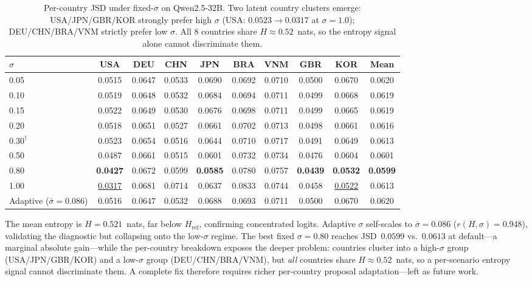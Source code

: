 \documentclass{article}
\begin{document}
\begin{table}[h]\centering\scriptsize
\caption{Per-country JSD under fixed-$\sigma$ on Qwen2.5-32B. Two latent country
clusters emerge: USA/JPN/GBR/KOR strongly prefer high $\sigma$ (USA: $0.0523\to0.0317$
at $\sigma{=}1.0$); DEU/CHN/BRA/VNM strictly prefer low $\sigma$. All 8 countries
share $H\approx0.52$~nats, so the entropy signal alone cannot discriminate them.}
\label{tab:sigma_percountry}
\begin{tabular}{lcccccccc|c}\toprule
$\sigma$ & USA & DEU & CHN & JPN & BRA & VNM & GBR & KOR & Mean \\\midrule
0.05 & 0.0515 & 0.0647 & 0.0533 & 0.0690 & 0.0692 & 0.0710 & 0.0500 & 0.0670 & 0.0620 \\
0.10 & 0.0519 & 0.0648 & 0.0532 & 0.0684 & 0.0694 & 0.0711 & 0.0499 & 0.0668 & 0.0619 \\
0.15 & 0.0522 & 0.0649 & 0.0530 & 0.0676 & 0.0698 & 0.0711 & 0.0499 & 0.0665 & 0.0619 \\
0.20 & 0.0518 & 0.0651 & 0.0527 & 0.0661 & 0.0702 & 0.0713 & 0.0498 & 0.0661 & 0.0616 \\
$0.30^\dagger$ & 0.0523 & 0.0654 & 0.0516 & 0.0644 & 0.0710 & 0.0717 & 0.0491 & 0.0649 & 0.0613 \\
0.50 & 0.0487 & 0.0661 & 0.0515 & 0.0601 & 0.0732 & 0.0734 & 0.0476 & 0.0604 & 0.0601 \\
0.80 & \textbf{0.0427} & 0.0672 & 0.0599 & \textbf{0.0585} & 0.0780 & 0.0757 & \textbf{0.0439} & \textbf{0.0532} & \textbf{0.0599} \\
1.00 & \underline{0.0317} & 0.0681 & 0.0714 & 0.0637 & 0.0833 & 0.0744 & 0.0458 & \underline{0.0522} & 0.0613 \\\midrule
Adaptive ($\bar\sigma{=}0.086$) & 0.0516 & 0.0647 & 0.0532 & 0.0688 & 0.0693 & 0.0711 & 0.0500 & 0.0670 & 0.0620 \\\bottomrule
\end{tabular}
\end{table}

The mean entropy is $H=0.521$~nats, far below $H_\text{ref}$, confirming
concentrated logits. Adaptive $\sigma$ self-scales to $\bar\sigma=0.086$
($r(H,\sigma){=}0.948$), validating the diagnostic but collapsing onto the
low-$\sigma$ regime. The best fixed $\sigma{=}0.80$ reaches JSD~$0.0599$ vs.\
$0.0613$ at default---a marginal absolute gain---while the per-country breakdown
exposes the deeper problem: countries cluster into a high-$\sigma$ group
(USA/JPN/GBR/KOR) and a low-$\sigma$ group (DEU/CHN/BRA/VNM), but \emph{all}
countries share $H\approx0.52$~nats, so a per-scenario entropy signal cannot
discriminate them. A complete fix therefore requires richer per-country proposal
adaptation---left as future work.
\end{document}

